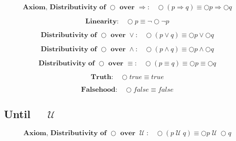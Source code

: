 \documentclass[fleqn, leqno]{article}
\newcommand{\Until}{\;\mathcal{U}\;}
\newcommand{\Next}{\bigcirc}
\newcommand{\spacer}{\vspace{-30pt}}
\begin{document}
\begin{equation}\label{E:distNextImp}
\textbf{Axiom, Distributivity of $\Next$ over $\Rightarrow$:}\quad \Next (p \Rightarrow q) \equiv \Next p \Rightarrow \Next q
\end{equation}

\spacer

\begin{equation}\label{E:linearity}
\textbf{Linearity:}\quad \Next p \equiv \lnot\Next\lnot p
\end{equation}

\spacer

\begin{equation}\label{E:distNextOr}
\textbf{Distributivity of $\Next$ over $\lor$:}\quad \Next (p \lor q) \equiv \Next p \lor \Next q
\end{equation}

\spacer

\begin{equation}\label{E:distNextAnd}
\textbf{Distributivity of $\Next$ over $\land$:}\quad \Next (p \land q) \equiv \Next p \land \Next q
\end{equation}

\spacer

\begin{equation}\label{E:distNextEquiv}
\textbf{Distributivity of $\Next$ over $\equiv$:}\quad \Next (p \equiv q) \equiv \Next p \equiv \Next q
\end{equation}

\spacer

\begin{equation}\label{E:nextTruth}
\textbf{Truth:}\quad \Next true \equiv true
\end{equation}

\spacer

\begin{equation}\label{E:nextFalse}
\textbf{Falsehood:}\quad \Next false \equiv false
\end{equation}

\subsection*{Until $\quad\Until$}

\begin{equation}\label{E:distNextUntil}
\textbf{Axiom, Distributivity of $\Next$ over $\Until$:}\quad \Next (p \Until q) \equiv \Next p \Until \Next q
\end{equation}
\end{document}
